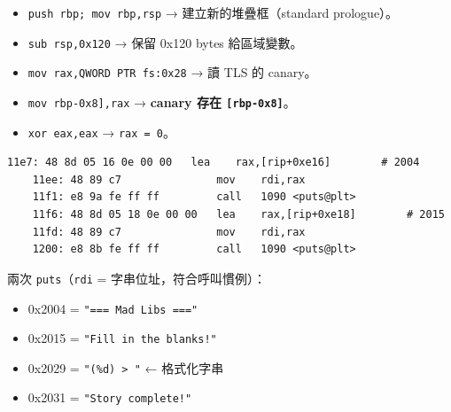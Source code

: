 \documentclass[10pt,a4paper]{article}
\newenvironment{Shaded}{\begin{snugshade}}{\end{snugshade}}
\newcommand{\NormalTok}[1]{#1}
\renewenvironment{Shaded}{%
  \def\FrameCommand{\fboxsep=3.2pt\colorbox{shadecolor}}%
  \MakeFramed{\advance\hsize-\width\FrameRestore\small}%
}{%
  \endMakeFramed
}
\providecommand{\tightlist}{%
  \setlength{\itemsep}{0pt}\setlength{\parskip}{0pt}}
\begin{document}
\begin{itemize}
\tightlist
\item
  \texttt{push\ \allowbreak{}rbp;\ \allowbreak{}mov\ \allowbreak{}rbp,\allowbreak{}rsp} → 建立新的堆疊框（standard
  prologue）。
\item
  \texttt{sub\ \allowbreak{}rsp,\allowbreak{}0x120} → 保留 0x120 bytes 給區域變數。
\item
  \texttt{mov\ \allowbreak{}rax,\allowbreak{}QWORD\ \allowbreak{}PTR\ \allowbreak{}fs:\allowbreak{}0x28} → 讀 TLS 的 canary。
\item
  \texttt{mov\ \allowbreak{}{[}rbp-\allowbreak{}0x8{]},\allowbreak{}rax} → \textbf{canary 存在
  \texttt{{[}rbp-\allowbreak{}0x8{]}}}。
\item
  \texttt{xor\ \allowbreak{}eax,\allowbreak{}eax} → \texttt{rax\ \allowbreak{}=\ \allowbreak{}0}。
\end{itemize}

\begin{Verbatim}[breaklines=true,breakanywhere=true,breakautoindent=false,fontsize=\fontsize{7.0}{9.5}\selectfont]
    11e7: 48 8d 05 16 0e 00 00   lea    rax,[rip+0xe16]        # 2004
    11ee: 48 89 c7               mov    rdi,rax
    11f1: e8 9a fe ff ff         call   1090 <puts@plt>
    11f6: 48 8d 05 18 0e 00 00   lea    rax,[rip+0xe18]        # 2015
    11fd: 48 89 c7               mov    rdi,rax
    1200: e8 8b fe ff ff         call   1090 <puts@plt>
\end{Verbatim}

兩次 \texttt{puts}（\texttt{rdi} = 字串位址，符合呼叫慣例）：

\begin{Shaded}
\end{Shaded}

\begin{itemize}
\tightlist
\item
  0x2004 = \texttt{"===\ \allowbreak{}Mad\ \allowbreak{}Libs\ \allowbreak{}==="}
\item
  0x2015 = \texttt{"Fill\ \allowbreak{}in\ \allowbreak{}the\ \allowbreak{}blanks!"}
\item
  0x2029 = \texttt{"(\%\allowbreak{}d)\ \allowbreak{}\textgreater{}\allowbreak{}\ \allowbreak{}"} ← 格式化字串
\item
  0x2031 = \texttt{"Story\ \allowbreak{}complete!"}
\end{itemize}
\end{document}
